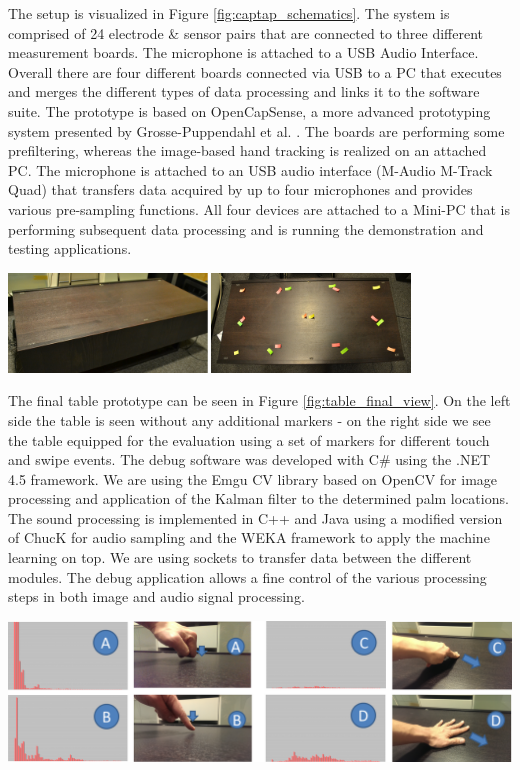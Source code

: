 The setup is visualized in Figure \ref{fig:captap_schematics}. The system is comprised of 24 electrode \& sensor pairs that are connected to three different measurement boards. The microphone is attached to a USB Audio Interface. Overall there are four different boards connected via USB to a  PC that executes and merges the different types of data processing and links it to the software suite. The prototype is based on OpenCapSense, a more advanced prototyping system presented by Grosse-Puppendahl et al. \cite{grosse2013opencapsense}. The boards are performing some prefiltering, whereas the image-based hand tracking is realized on an attached PC. The microphone is attached to an USB audio interface (M-Audio M-Track Quad) that transfers data acquired by up to four microphones and provides various pre-sampling functions. All four devices are attached to a Mini-PC that is performing subsequent data processing and is running the demonstration and testing applications. 
 
\begin{minipage}{\linewidth}
\centering
\includegraphics[width=0.8\textwidth]{images/table_final_view}
\label{fig:table_final_view}
\end{minipage}

The final table prototype can be seen in Figure \ref{fig:table_final_view}. On the left side the table is seen without any additional markers - on the right side we see the table equipped for the evaluation using a set of markers for different touch and swipe events. The debug software was developed with C\# using the .NET 4.5 framework. We are using the Emgu CV library based on OpenCV for image processing and application of the Kalman filter to the determined palm locations. The sound processing is implemented in C++ and Java using a modified version of ChucK for audio sampling and the WEKA framework to apply the machine learning on top. We are using sockets to transfer data between the different modules. The debug application allows a fine control of the various processing steps in both image and audio signal processing.

\begin{minipage}{\linewidth}
\centering
\includegraphics[width=1.0\textwidth]{images/alltouch}
\label{fig:alltouch}
\end{minipage}

